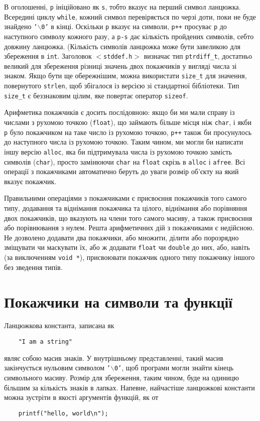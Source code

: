 \documentclass[a4paper,12pt]{book}
\begin{document}
  В оголошенні, \texttt{p} ініційовано як \texttt{s}, тобто вказує на перший символ
  ланцюжка. Всередині циклу \texttt{while}, кожний символ перевіряється по черзі доти,
  поки не буде знайдено \texttt{'\mbox{$\backslash$}0'} в кінці. Оскільки \texttt{p} вказує на символи,
  \texttt{p++} просуває \texttt{p} до наступного символу кожного разу, а \texttt{p-s} дає
  кількість пройдених символів, себто довжину ланцюжка. (Кількість символів ланцюжка може
  бути завеликою для збереження в \texttt{int}. Заголовок \texttt{\mbox{$<$}stddef.h\mbox{$>$}}
  визначає тип \texttt{ptrdiff\_t}, достатньо великий для збереження різниці значень двох
  покажчиків у вигляді числа зі знаком. Якщо бути ще обережнішим, можна використати
  \texttt{size\_t} для значення, повернутого \texttt{strlen}, щоб збігалося із версією зі
  стандартної бібліотеки. Тип \texttt{size\_t} є беззнаковим цілим, яке повертає оператор
  \texttt{sizeof}.

  Арифметика покажчиків є досить послідовною: якщо би ми мали справу із числами з рухомою
  точкою (\texttt{float}), що займають більше місця ніж \texttt{char}, і якби \texttt{p}
  було покажчиком на таке число із рухомою точкою, \texttt{p++} також би просунулось до
  наступного числа із рухомою точкою. Таким чином, ми могли би написати іншу версію
  \texttt{alloc}, яка би підтримувала числа із рухомою точкою замість символів
  (\texttt{char}), просто замінюючи \texttt{char} на \texttt{float} скрізь в
  \texttt{alloc} і \texttt{afree}. Всі операції з покажчиками автоматично беруть до уваги
  розмір об'єкту на який вказує покажчик.

  Правильними операціями з покажчиками є присвоєння покажчиків того самого типу, додавання
  та віднімання покажчика та цілого, віднімання або порівняння двох покажчиків, що
  вказують на члени того самого масиву, а також присвоєння або порівнювання з нулем. Решта
  арифметичних дій з покажчиками є недійсною. Не дозволено додавати два покажчики, або
  множити, ділити або порозрядно зміщувати чи маскувати їх, або ж додавати \texttt{float}
  чи \texttt{double} до них, або, навіть (за виключенням \texttt{void *}), присвоювати
  покажчик одного типу покажчику іншого без зведення типів.

\section{Покажчики на символи та функції}


  Ланцюжкова константа, записана як
  \begin{verbatim}
    "I am a string"
  \end{verbatim}
  являє собою масив знаків. У внутрішньому представленні, такий масив закінчується
  нульовим символом \texttt{'\mbox{$\backslash$}0'}, щоб програми могли знайти кінець символьного масиву.
  Розмір для збереження, таким чином, буде на одиницю більшим за кількість знаків в
  лапках. Напевне, найчастіше ланцюжкові константи можна зустріти в якості аргументів
  функцій, як от
  \begin{verbatim}
    printf("hello, world\n");
  \end{verbatim}
\end{document}
